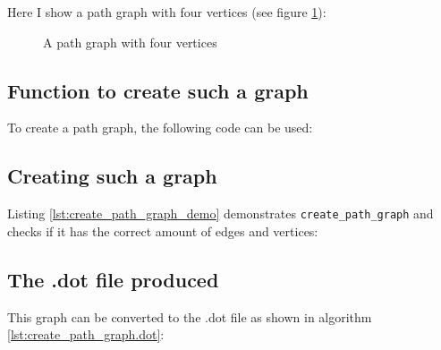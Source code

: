 Here I show a path graph with four vertices 
(see figure \ref{fig:create_path_graph}):

\begin{figure}
  \caption{A path graph with four vertices}
  \label{fig:create_path_graph}
\end{figure}

\subsection{Function to create such a graph}

To create a path graph, the following code can be used:



\subsection{Creating such a graph}

Listing \ref{lst:create_path_graph_demo}
demonstrates \verb;create_path_graph; 
and checks if it has the correct amount of edges and vertices:



\subsection{The .dot file produced}
\label{subsec:create_path_graph.dot}

This graph can be converted to the .dot file 
as shown in algorithm \ref{lst:create_path_graph.dot}:



